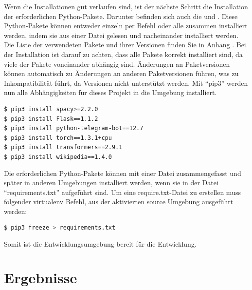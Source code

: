 \documentclass[
        ngerman,
        paper=a4,
        numbers=noendperiod,
]{scrreprt}
\begin{document}
Wenn die Installationen gut verlaufen sind, ist der nächste Schritt die Installation der erforderlichen Python-Pakete.
Darunter befinden sich auch die  und . Diese Python-Pakete können entweder einzeln per Befehl oder alle zusammen installiert werden, indem sie aus einer Datei gelesen und nacheinander installiert werden. Die Liste der verwendeten Pakete und ihrer Versionen finden Sie in Anhang . Bei der Installation ist darauf zu achten, dass alle Pakete korrekt installiert sind, da viele der Pakete voneinander abhängig sind. Änderungen an Paketversionen können automatisch zu Änderungen an anderen Paketversionen führen, was zu Inkompatibilität führt, da Versionen nicht unterstützt werden. 
Mit \enquote{pip3} werden nun alle Abhängigkeiten für dieses Projekt in die Umgebung installiert.


\begin{lstlisting}[language=bash, caption=Installieren der Abhängigkeiten mit pip3]
$ pip3 install spacy>=2.2.0
$ pip3 install Flask==1.1.2
$ pip3 install python-telegram-bot==12.7
$ pip3 install torch==1.3.1+cpu
$ pip3 install transformers==2.9.1
$ pip3 install wikipedia==1.4.0
\end{lstlisting}



Die erforderlichen Python-Pakete können mit einer Datei zusammengefasst und später in anderen Umgebungen installiert werden, wenn sie in der Datei \enquote{requirements.txt} aufgeführt sind. Um eine require.txt-Datei zu erstellen muss folgender virtualenv Befehl, aus der aktivierten source Umgebung ausgeführt werden:

\begin{lstlisting}[language=bash, caption=Erstellen der requirements.txt Datei]
$ pip3 freeze > requirements.txt
\end{lstlisting}

Somit ist die Entwicklungsumgebung bereit für die Entwicklung.



\chapter{Ergebnisse}

\end{document}
